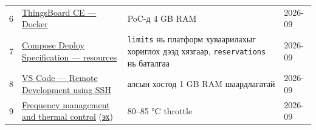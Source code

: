 \begin{longtable}[]{@{}llll@{}}
\begin{minipage}[t]{0.22\columnwidth}
6\strut
\end{minipage} & \begin{minipage}[t]{0.22\columnwidth}\raggedright
\href{https://thingsboard.io/docs/installation/docker/}{ThingsBoard CE --- Docker}\strut
\end{minipage} & \begin{minipage}[t]{0.22\columnwidth}\raggedright
PoC-д 4 GB RAM\strut
\end{minipage} & \begin{minipage}[t]{0.22\columnwidth}\raggedright
2026-09\strut
\end{minipage}\tabularnewline
\begin{minipage}[t]{0.22\columnwidth}\raggedright
7\strut
\end{minipage} & \begin{minipage}[t]{0.22\columnwidth}\raggedright
\href{https://docs.docker.com/reference/compose-file/deploy/}{Compose Deploy Specification --- resources}\strut
\end{minipage} & \begin{minipage}[t]{0.22\columnwidth}\raggedright
\texttt{limits} нь платформ хуваарилахыг хориглох дээд хязгаар, \texttt{reservations} нь баталгаа\strut
\end{minipage} & \begin{minipage}[t]{0.22\columnwidth}\raggedright
2026-09\strut
\end{minipage}\tabularnewline
\begin{minipage}[t]{0.22\columnwidth}\raggedright
8\strut
\end{minipage} & \begin{minipage}[t]{0.22\columnwidth}\raggedright
\href{https://code.visualstudio.com/docs/remote/ssh}{VS Code --- Remote Development using SSH}\strut
\end{minipage} & \begin{minipage}[t]{0.22\columnwidth}\raggedright
алсын хостод 1 GB RAM шаардлагатай\strut
\end{minipage} & \begin{minipage}[t]{0.22\columnwidth}\raggedright
2026-09\strut
\end{minipage}\tabularnewline
\begin{minipage}[t]{0.22\columnwidth}\raggedright
9\strut
\end{minipage} & \begin{minipage}[t]{0.22\columnwidth}\raggedright
\href{https://www.raspberrypi.com/documentation/computers/raspberry-pi.html\#frequency-management-and-thermal-control}{Frequency management and thermal control} (\href{https://github.com/raspberrypi/documentation/blob/develop/documentation/asciidoc/computers/raspberry-pi/frequency-management.adoc}{эх})\strut
\end{minipage} & \begin{minipage}[t]{0.22\columnwidth}\raggedright
80--85 °C throttle\strut
\end{minipage} & \begin{minipage}[t]{0.22\columnwidth}\raggedright
2026-09\strut
\end{minipage}\tabularnewline
\bottomrule
\end{longtable}\endgroup
